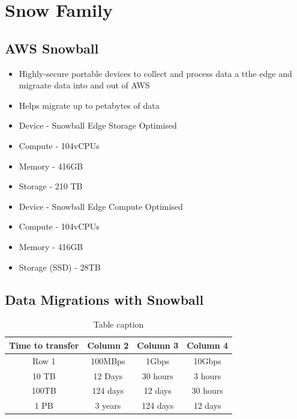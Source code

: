 {%


\section{Snow Family}

\subsection{AWS Snowball}
\begin{itemize}
    \item Highly-secure portable devices to collect and process data a tthe edge and migraate data into and out of AWS
    \item Helps migrate up to petabytes of data
\end{itemize}

\begin{itemize}
    \item Device - Snowball Edge Storage Optimised
    \item Compute - 104vCPUs
    \item Memory - 416GB
    \item Storage - 210 TB
\end{itemize}

\begin{itemize}
    \item Device - Snowball Edge Compute Optimised
    \item  Compute - 104vCPUs
    \item Memory - 416GB
    \item Storage (SSD) - 28TB
\end{itemize}

\subsection{Data Migrations with Snowball}

\begin{table}[h]
    \centering
    \begin{tabular}{|c|c|c|c|}
        \hline
        Time to transfer & Column 2 & Column 3 & Column 4 \\
        \hline
        Row 1            & 100MBps  & 1Gbps    & 10Gbps   \\
        \hline
        10 TB            & 12 Days  & 30 hours & 3 hours  \\
        \hline
        100TB            & 124 days & 12 days  & 30 hours \\
        \hline
        1 PB             & 3 years  & 124 days & 12 days  \\
        \hline
        \hline
    \end{tabular}
    \caption{Table caption}
\end{table}

}

